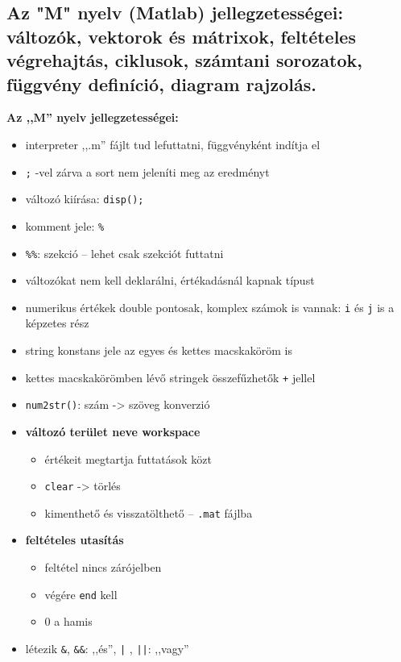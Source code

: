 \subsection{Az "M" nyelv (Matlab) jellegzetességei: változók, vektorok és mátrixok, feltételes végrehajtás, ciklusok, számtani sorozatok, függvény definíció, diagram rajzolás.}

\textbf{Az ,,M'' nyelv jellegzetességei:}
\begin{itemize}
    \item interpreter ,,.m'' fájlt tud lefuttatni, függvényként indítja el
    \item \verb|;| -vel zárva a sort nem jeleníti meg az eredményt
    \item változó kiírása: \verb|disp();|
    \item komment jele: \verb|%|
    \item \verb|%%|: szekció -- lehet csak szekciót futtatni
    \item változókat nem kell deklarálni, értékadásnál kapnak típust
    \item numerikus értékek double pontosak, komplex számok is vannak: \verb|i| és \verb|j| is a képzetes rész
    \item string konstans jele az egyes és kettes macskaköröm is
    \item kettes macskakörömben lévő stringek összefűzhetők \verb|+| jellel
    \item \verb|num2str()|: szám -> szöveg konverzió
    \item \textbf{változó terület neve workspace}
    \begin{itemize}
        \item értékeit megtartja futtatások közt
        \item \verb|clear| -> törlés
        \item kimenthető és visszatölthető -- \verb|.mat| fájlba
    \end{itemize}
    \item \textbf{feltételes utasítás}
    \begin{itemize}
        \item feltétel nincs zárójelben
        \item végére \verb|end| kell
        \item 0 a hamis
    \end{itemize}
    \item létezik \verb|&|, \verb|&&|: ,,és'', \verb+|+ , \verb+||+: ,,vagy''
    \begin{itemize}

\end{itemize}
\end{itemize}
